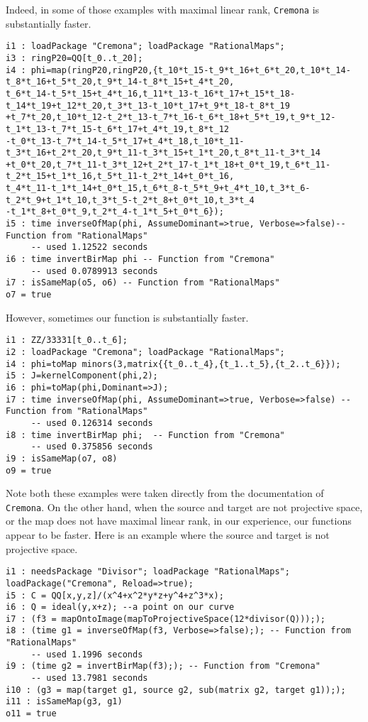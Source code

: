 \documentclass[11pt]{amsart}
\numberwithin{equation}{theorem}
\renewcommand{\:}{\colon}
\theoremstyle{theorem}
\begin{document}
{Indeed, in some of those examples with maximal linear rank, {\tt Cremona} is substantially faster.  
{\scriptsize
\begin{verbatim}
i1 : loadPackage "Cremona"; loadPackage "RationalMaps";
i3 : ringP20=QQ[t_0..t_20];
i4 : phi=map(ringP20,ringP20,{t_10*t_15-t_9*t_16+t_6*t_20,t_10*t_14-t_8*t_16+t_5*t_20,t_9*t_14-t_8*t_15+t_4*t_20,
t_6*t_14-t_5*t_15+t_4*t_16,t_11*t_13-t_16*t_17+t_15*t_18-t_14*t_19+t_12*t_20,t_3*t_13-t_10*t_17+t_9*t_18-t_8*t_19
+t_7*t_20,t_10*t_12-t_2*t_13-t_7*t_16-t_6*t_18+t_5*t_19,t_9*t_12-t_1*t_13-t_7*t_15-t_6*t_17+t_4*t_19,t_8*t_12
-t_0*t_13-t_7*t_14-t_5*t_17+t_4*t_18,t_10*t_11-t_3*t_16+t_2*t_20,t_9*t_11-t_3*t_15+t_1*t_20,t_8*t_11-t_3*t_14
+t_0*t_20,t_7*t_11-t_3*t_12+t_2*t_17-t_1*t_18+t_0*t_19,t_6*t_11-t_2*t_15+t_1*t_16,t_5*t_11-t_2*t_14+t_0*t_16,
t_4*t_11-t_1*t_14+t_0*t_15,t_6*t_8-t_5*t_9+t_4*t_10,t_3*t_6-t_2*t_9+t_1*t_10,t_3*t_5-t_2*t_8+t_0*t_10,t_3*t_4
-t_1*t_8+t_0*t_9,t_2*t_4-t_1*t_5+t_0*t_6});
i5 : time inverseOfMap(phi, AssumeDominant=>true, Verbose=>false)-- Function from "RationalMaps"
     -- used 1.12522 seconds
i6 : time invertBirMap phi -- Function from "Cremona"
     -- used 0.0789913 seconds
i7 : isSameMap(o5, o6) -- Function from "RationalMaps"
o7 = true
\end{verbatim}
}
{\normalsize}
However, sometimes our function is substantially faster.
{\scriptsize
\begin{verbatim}
i1 : ZZ/33331[t_0..t_6];
i2 : loadPackage "Cremona"; loadPackage "RationalMaps";
i4 : phi=toMap minors(3,matrix{{t_0..t_4},{t_1..t_5},{t_2..t_6}});
i5 : J=kernelComponent(phi,2);
i6 : phi=toMap(phi,Dominant=>J);
i7 : time inverseOfMap(phi, AssumeDominant=>true, Verbose=>false) -- Function from "RationalMaps"
     -- used 0.126314 seconds
i8 : time invertBirMap phi;  -- Function from "Cremona"
     -- used 0.375856 seconds
i9 : isSameMap(o7, o8)
o9 = true
\end{verbatim}}

{\normalsize
Note both these examples were taken directly from the documentation of {\tt Cremona}.
On the other hand, when the source and target are not projective space, or the map does not have maximal linear rank, in our experience, our functions appear to be faster.  Here is an example where the source and target is not projective space.
}

{\scriptsize
\begin{verbatim}
i1 : needsPackage "Divisor"; loadPackage "RationalMaps"; loadPackage("Cremona", Reload=>true);
i5 : C = QQ[x,y,z]/(x^4+x^2*y*z+y^4+z^3*x);
i6 : Q = ideal(y,x+z); --a point on our curve
i7 : (f3 = mapOntoImage(mapToProjectiveSpace(12*divisor(Q))););
i8 : (time g1 = inverseOfMap(f3, Verbose=>false);); -- Function from "RationalMaps"
     -- used 1.1996 seconds
i9 : (time g2 = invertBirMap(f3);); -- Function from "Cremona"
     -- used 13.7981 seconds
i10 : (g3 = map(target g1, source g2, sub(matrix g2, target g1)););
i11 : isSameMap(g3, g1)
o11 = true
\end{verbatim}
}

}
\end{document}
